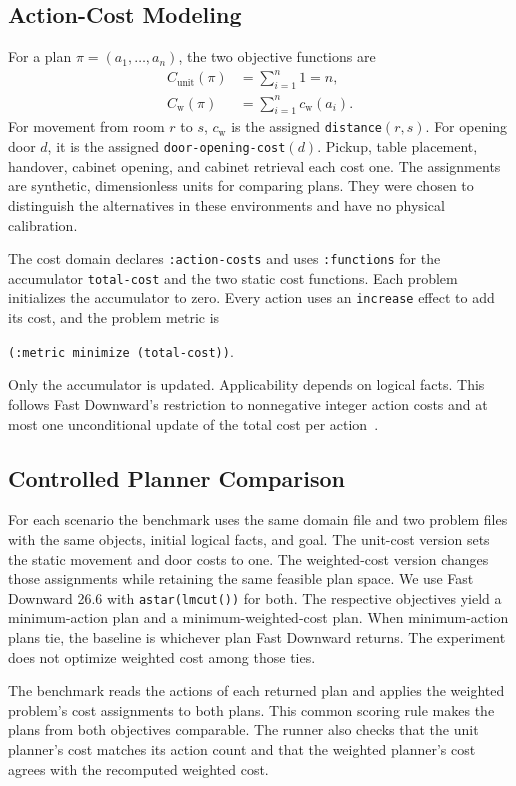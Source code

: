 \documentclass[conference,a4paper]{IEEEtran}
\theoremstyle{plain}
\theoremstyle{definition}
\theoremstyle{remark}
\begin{document}
\subsection{Action-Cost Modeling}
For a plan $\pi=(a_1,\ldots,a_n)$, the two objective functions are
\begin{align}
 C_{\mathrm{unit}}(\pi) &= \sum_{i=1}^{n} 1 = n, \\
 C_{\mathrm{w}}(\pi) &= \sum_{i=1}^{n} c_{\mathrm{w}}(a_i).
\end{align}
For movement from room $r$ to $s$, $c_{\mathrm{w}}$ is the assigned \texttt{distance}$(r,s)$. For opening door $d$, it is the assigned \texttt{door-opening-cost}$(d)$. Pickup, table placement, handover, cabinet opening, and cabinet retrieval each cost one. The assignments are synthetic, dimensionless units for comparing plans. They were chosen to distinguish the alternatives in these environments and have no physical calibration.

The cost domain declares \texttt{:action-costs} and uses \texttt{:functions} for the accumulator \texttt{total-cost} and the two static cost functions. Each problem initializes the accumulator to zero. Every action uses an \texttt{increase} effect to add its cost, and the problem metric is
\begin{center}
\texttt{(:metric minimize (total-cost))}.
\end{center}
Only the accumulator is updated. Applicability depends on logical facts. This follows Fast Downward's restriction to nonnegative integer action costs and at most one unconditional update of the total cost per action~\cite{fd26pddl}.

\subsection{Controlled Planner Comparison}
For each scenario the benchmark uses the same domain file and two problem files with the same objects, initial logical facts, and goal. The unit-cost version sets the static movement and door costs to one. The weighted-cost version changes those assignments while retaining the same feasible plan space. We use Fast Downward 26.6 with \texttt{astar(lmcut())} for both. The respective objectives yield a minimum-action plan and a minimum-weighted-cost plan. When minimum-action plans tie, the baseline is whichever plan Fast Downward returns. The experiment does not optimize weighted cost among those ties.

The benchmark reads the actions of each returned plan and applies the weighted problem's cost assignments to both plans. This common scoring rule makes the plans from both objectives comparable. The runner also checks that the unit planner's cost matches its action count and that the weighted planner's cost agrees with the recomputed weighted cost.
\end{document}
